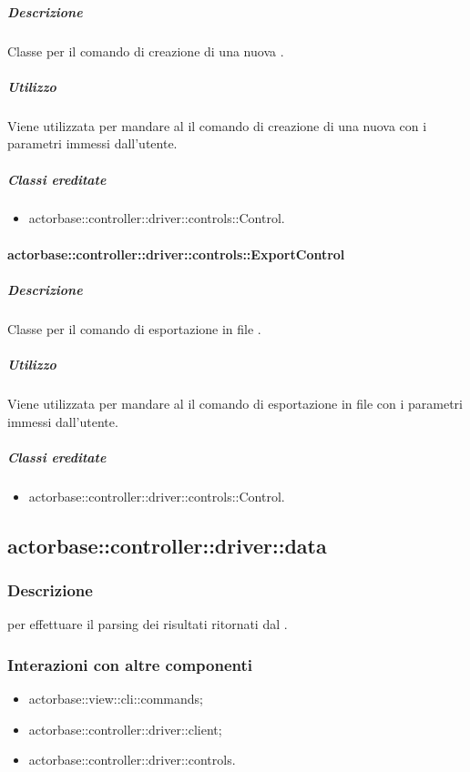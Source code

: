\documentclass{scalatekids-article}
\begin{document}
\subparagraph{Descrizione}

Classe per il comando di creazione di una nuova .

\subparagraph{Utilizzo}

Viene utilizzata per mandare al  il comando di creazione di una
nuova  con i parametri immessi dall'utente.

\subparagraph{Classi ereditate}

\begin{itemize}
\item actorbase::controller::driver::controls::Control.
\end{itemize}

\paragraph{actorbase::controller::driver::controls::ExportControl}

\subparagraph{Descrizione}

Classe per il comando di esportazione in file .

\subparagraph{Utilizzo}

Viene utilizzata per mandare al  il comando di esportazione in
file  con i parametri immessi dall'utente.

\subparagraph{Classi ereditate}

\begin{itemize}
\item actorbase::controller::driver::controls::Control.
\end{itemize}

\subsection{actorbase::controller::driver::data}

\subsubsection{Descrizione}

 per effettuare il parsing dei risultati ritornati dal
.

\subsubsection{Interazioni con altre componenti}
\begin{itemize}
\item actorbase::view::cli::commands;
\item actorbase::controller::driver::client;
\item actorbase::controller::driver::controls.
\end{itemize}
\end{document}
